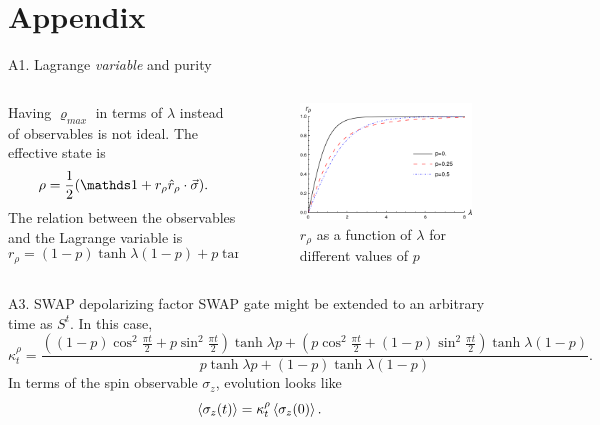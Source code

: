 \section{Appendix}

\begin{frame}{A1. Lagrange \textit{variable} and purity}
    \begin{columns}
        \begin{column}{0.5\textwidth}
            Having $\varrho_{max}$ in terms of $\lambda$ instead of observables is not ideal. The effective state is
            \begin{equation*}
                \rho=\frac{1}{2}(\Id+r_{\rho}\hat{r}_{\rho}\cdot\vec{\sigma}).
            \end{equation*}
            The relation between the observables and the Lagrange variable is
            \begin{equation*}
                r_{\rho}=(1-p)\tanh{\lambda (1-p)}+p\tanh{\lambda p}.
            \end{equation*}
        \end{column}
        \begin{column}{0.5\textwidth}
            \begin{figure}[h!]
                \includegraphics[width=0.8\columnwidth]{figures/r(lambda).png}%
                \caption{$r_{\rho}$ as a function of $\lambda$ for different values of $p$}
            \end{figure}
        \end{column}
    \end{columns}
\end{frame}


\begin{frame}{A3. SWAP depolarizing factor}
    SWAP gate might be extended to an arbitrary time as $S^{t}$. In this case, 
    \begin{equation*}
        \kappa_{t}^{\rho}=\frac{((1-p)\cos^{2}{\frac{\pi t}{2}}+p\sin^{2}{\frac{\pi t}{2}})\tanh{\lambda p}+(p\cos^{2}{\frac{\pi t}{2}}+(1-p)\sin^{2}{\frac{\pi t}{2}})\tanh{\lambda (1-p)}}{
          p\tanh{\lambda p}+(1-p)\tanh{\lambda (1-p)}}.
      \end{equation*}
      In terms of the spin observable $\sigma_{z}$, evolution looks like
\begin{equation}
  \expval{\sigma_{z}(t)}=\kappa_{t}^{\rho}\expval{\sigma_{z}(0)}.
\end{equation}
\end{frame}

